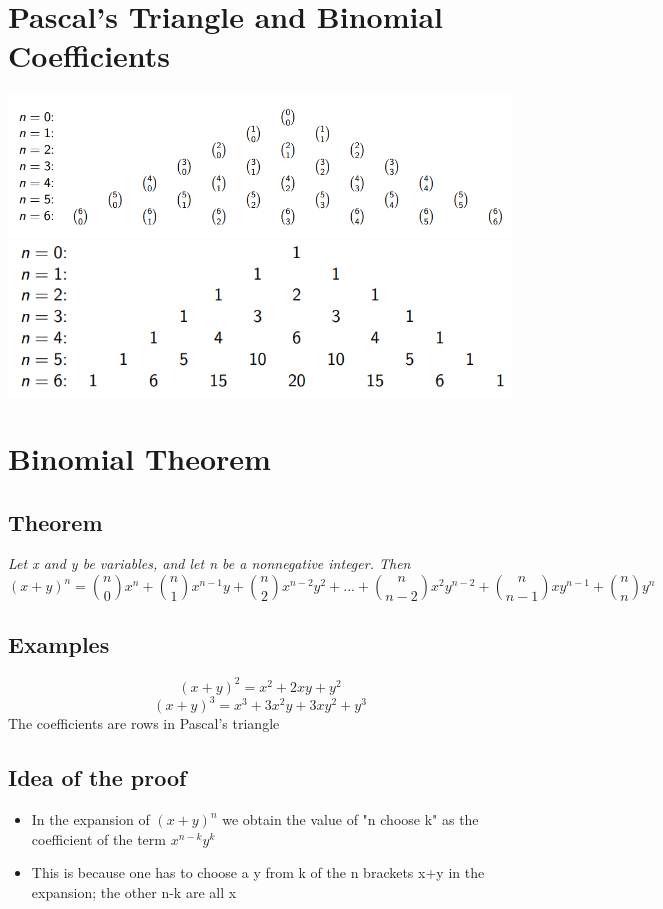 \documentclass{article}[18pt]
\begin{document}
\section{Pascal's Triangle and Binomial Coefficients}
\begin{center}
\includegraphics[scale=0.7]{pascal_triangle_1.png}\\
\includegraphics[scale=0.7]{pascal_triangle_2.png}
\end{center}
\section{Binomial Theorem}
\subsection{Theorem}
\textit{Let x and y be variables, and let n be a nonnegative integer. Then}
$$(x+y)^n=\binom{n}{0}x^n+\binom{n}{1}x^{n-1}y+\binom{n}{2}x^{n-2}y^2+...+\binom{n}{n-2}x^2y^{n-2}+\binom{n}{n-1}xy^{n-1}+\binom{n}{n}y^n$$
\subsection{Examples}
$$(x+y)^2=x^2+2xy+y^2$$
$$(x+y)^3=x^3+3x^2y+3xy^2+y^3$$
The coefficients are rows in Pascal's triangle
\subsection{Idea of the proof}
\begin{itemize}
\item In the expansion of $(x+y)^n$ we obtain the value of "n choose k" as the coefficient of the term $x^{n-k}y^{k}$
\item This is because one has to choose a y from k of the n brackets x+y in the expansion; the other n-k are all x
\end{itemize}
\end{document}
